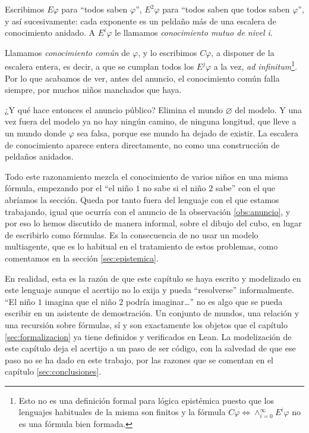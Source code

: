 Escribimos $E\varphi$ para ``todos saben $\varphi$'', $E^{2}\varphi$ para ``todos saben que todos saben $\varphi$'', y así sucesivamente: cada exponente es un peldaño más de una escalera de conocimiento anidado. A $E^{i}\varphi$ le llamamos \emph{conocimiento mutuo de nivel i}.

Llamamos \emph{conocimiento común} de $\varphi$, y lo escribimos $C\varphi$, a disponer de la escalera entera, es decir, a que se cumplan todos los $E^{j}\varphi$ a la vez, \emph{ad infinitum}\footnote{Esto no es una definición formal para lógica epistémica puesto que los lenguajes habituales de la misma son finitos y la fórmula $C\varphi \iff \land_{i=0}^{\infty} E^{i}\varphi$ no es una fórmula bien formada.}. Por lo que acabamos de ver, antes del anuncio, el conocimiento común falla siempre, por muchos niños manchados que haya.

¿Y qué hace entonces el anuncio público? Elimina el mundo $\varnothing$ del modelo. Y una vez fuera del modelo ya no hay ningún camino, de ninguna longitud, que lleve a un mundo donde $\varphi$ sea falsa, porque ese mundo ha dejado de existir. La escalera de conocimiento aparece entera directamente, no como una construcción de peldaños anidados.

Todo este razonamiento mezcla el conocimiento de varios niños en una misma fórmula, empezando por el ``el niño $1$ no sabe si el niño $2$ sabe'' con el que abríamos la sección. Queda por tanto fuera del lenguaje con el que estamos trabajando, igual que ocurría con el anuncio de la observación \ref{obs:anuncio}, y por eso lo hemos discutido de manera informal, sobre el dibujo del cubo, en lugar de escribirlo como fórmulas. Es la consecuencia de no usar un modelo multiagente, que es lo habitual en el tratamiento de estos problemas, como comentamos en la sección \ref{sec:epistemica}.

En realidad, esta es la razón de que este capítulo se haya escrito y modelizado en este lenguaje aunque el acertijo no lo exija y pueda ``resolverse'' informalmente. ``El niño $1$ imagina que el niño $2$ podría imaginar\dots'' no es algo que se pueda escribir en un asistente de demostración. Un conjunto de mundos, una relación y una recursión sobre fórmulas, sí y son exactamente los objetos que el capítulo \ref{sec:formalizacion} ya tiene definidos y verificados en Lean. La modelización de este capítulo deja el acertijo a un paso de ser código, con la salvedad de que ese paso no se ha dado en este trabajo, por las razones que se comentan en el capítulo \ref{sec:conclusiones}.